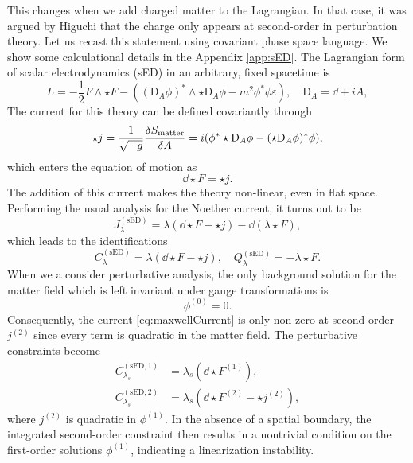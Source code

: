 \documentclass[]{jkpaper}
\theoremstyle{plain}
\theoremstyle{definition}
\newcommand{\eps}{\varepsilon}
\newcommand{\DD}[1]{\text{D}_A#1}
\begin{document}
This changes when we add charged matter to the Lagrangian. In that case, it was argued by Higuchi \cite{Higuchi:1991tk} that the charge only appears at second-order in perturbation theory. Let us recast this statement using covariant phase space language.  We show some calculational details in the Appendix \ref{app:sED}. The Lagrangian form of scalar electrodynamics (sED) in an arbitrary, fixed spacetime is
\begin{equation}
    L = -\frac{1}{2} F \wedge \star F - ((\DD \phi)^* \wedge \star \DD \phi - m^2 \phi^* \phi \eps), \quad \DD = \dd + iA,
\end{equation}
The current for this theory can be defined covariantly through
\begin{equation}
    \star j = \frac{1}{\sqrt{-g}} \fdv{S_\text{matter}}{A} = i (\phi^* \star \DD \phi - (\star \DD \phi)^* \phi),
    \label{eq:maxwellCurrent}
\end{equation}
which enters the equation of motion as 
\begin{equation}\label{eq: EOM  sED}
    \dd \star F = \star j.
\end{equation}
The addition of this current makes the theory non-linear, even in flat space.
Performing the usual analysis for the Noether current, it turns out to be 
\begin{equation}
    J_\lambda^{(\text{sED})} = \lambda (\dd \star F - \star j) - \dd(\lambda \star F),
\end{equation}
which leads to the identifications
\begin{equation}
    \label{eq:gaussLaw}
    C_\lambda^{(\text{sED})} = \lambda (\dd \star F - \star j), \quad Q_\lambda^{(\text{sED})} = -\lambda \star F.
\end{equation}
When we a consider perturbative analysis, the only background solution for the matter field which is left invariant under gauge transformations  is 
\begin{equation}
    \phi^{(0)} = 0.
\end{equation}
Consequently, the current \eqref{eq:maxwellCurrent} is only non-zero at second-order $j^{(2)}$ since every term is quadratic in the matter field.  The perturbative constraints become
\begin{align}
    C_{\lambda_s}^{(\text{sED},1)} &= \lambda_s ( \dd\star F^{(1)}), \\
    C_{\lambda_s}^{(\text{sED},2)} &= \lambda_s ( \dd\star F^{(2)}-\star j^{(2)}),
\end{align}
where $j^{(2)}$ is quadratic in $\phi^{(1)}$.  In the absence of a spatial boundary, the integrated second-order constraint then results in a nontrivial condition on the first-order solutions $\phi^{(1)}$, indicating a linearization instability.
\end{document}
